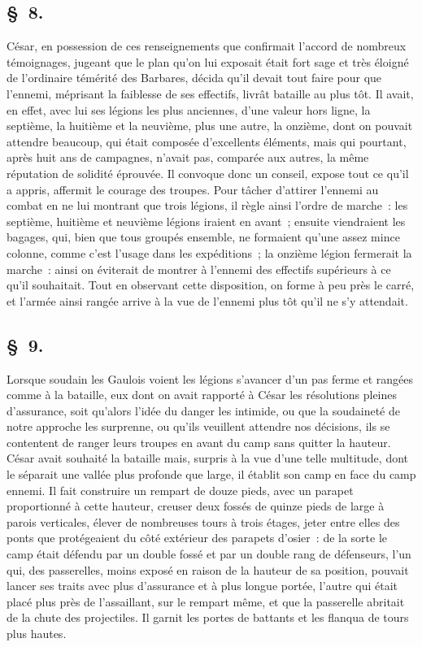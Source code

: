 \documentclass[french,twoside]{book} %
\begin{document}
\subsection[{§ 8.}]{ \textsc{§ 8.} }
\noindent César, en possession de ces renseignements que confirmait l’accord de nombreux témoignages, jugeant que le plan qu’on lui exposait était fort sage et très éloigné de l’ordinaire témérité des Barbares, décida qu’il devait tout faire pour que l’ennemi, méprisant la faiblesse de ses effectifs, livrât bataille au plus tôt. Il avait, en effet, avec lui ses légions les plus anciennes, d’une valeur hors ligne, la septième, la huitième et la neuvième, plus une autre, la onzième, dont on pouvait attendre beaucoup, qui était composée d’excellents éléments, mais qui pourtant, après huit ans de campagnes, n’avait pas, comparée aux autres, la même réputation de solidité éprouvée. Il convoque donc un conseil, expose tout ce qu’il a appris, affermit le courage des troupes. Pour tâcher d’attirer l’ennemi au combat en ne lui montrant que trois légions, il règle ainsi l’ordre de marche : les septième, huitième et neuvième légions iraient en avant ; ensuite viendraient les bagages, qui, bien que tous groupés ensemble, ne formaient qu’une assez mince colonne, comme c’est l’usage dans les expéditions ; la onzième légion fermerait la marche : ainsi on éviterait de montrer à l’ennemi des effectifs supérieurs à ce qu’il souhaitait. Tout en observant cette disposition, on forme à peu près le carré, et l’armée ainsi rangée arrive à la vue de l’ennemi plus tôt qu’il ne s’y attendait.
\subsection[{§ 9.}]{ \textsc{§ 9.} }
\noindent Lorsque soudain les Gaulois voient les légions s’avancer d’un pas ferme et rangées comme à la bataille, eux dont on avait rapporté à César les résolutions pleines d’assurance, soit qu’alors l’idée du danger les intimide, ou que la soudaineté de notre approche les surprenne, ou qu’ils veuillent attendre nos décisions, ils se contentent de ranger leurs troupes en avant du camp sans quitter la hauteur. César avait souhaité la bataille mais, surpris à la vue d’une telle multitude, dont le séparait une vallée plus profonde que large, il établit son camp en face du camp ennemi. Il fait construire un rempart de douze pieds, avec un parapet proportionné à cette hauteur, creuser deux fossés de quinze pieds de large à parois verticales, élever de nombreuses tours à trois étages, jeter entre elles des ponts que protégeaient du côté extérieur des parapets d’osier : de la sorte le camp était défendu par un double fossé et par un double rang de défenseurs, l’un qui, des passerelles, moins exposé en raison de la hauteur de sa position, pouvait lancer ses traits avec plus d’assurance et à plus longue portée, l’autre qui était placé plus près de l’assaillant, sur le rempart même, et que la passerelle abritait de la chute des projectiles. Il garnit les portes de battants et les flanqua de tours plus hautes.
\end{document}
